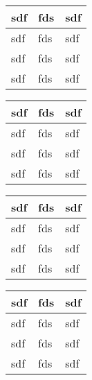 




\begin{table}[H]
  \begin{tabularx}{0.8\textwidth}{|XXX|}
    \hline
    sdf & fds & sdf \\
    \hline
    sdf & fds & sdf \\
    sdf & fds & sdf \\
    sdf & fds & sdf \\
    \hline
  \end{tabularx}
\end{table}

\begin{table}[H]
  \oddrowcolors
  \begin{tabularx}{0.8\textwidth}{|XXX|}
    \hline
    sdf & fds & sdf \\
    \hline
    sdf & fds & sdf \\
    sdf & fds & sdf \\
    sdf & fds & sdf \\
    \hline
  \end{tabularx}
\end{table}

\begin{table}[H]
  \oddrowcolors
  \begin{tabularx}{0.8\textwidth}{|XXX|}
    \hline
    sdf & fds & sdf \\
    \hline
    sdf & fds & sdf \\
    sdf & fds & sdf \\
    sdf & fds & sdf \\
    \hline
  \end{tabularx}
\end{table}

\begin{table}[H]
  \def\eltransparency{0.2}
  \begin{tabularx}{0.8\textwidth}{|XXX|}
    \hline
    sdf & fds & sdf \\
    \hline
    sdf & fds & sdf \\
    sdf & fds & sdf \\
    sdf & fds & sdf \\
    \hline
  \end{tabularx}
\end{table}

